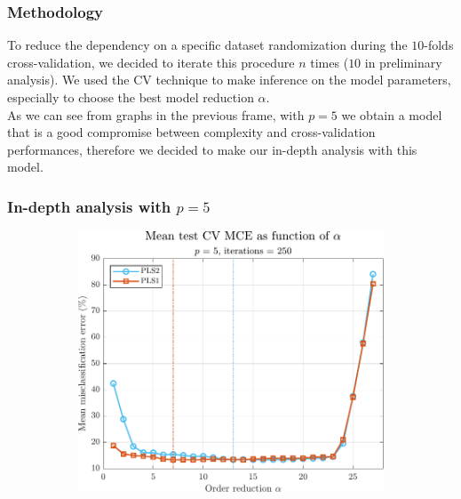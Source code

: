\begin{frame}
	\frametitle{Methodology}
	To reduce the dependency on a specific dataset randomization during the $10$-folds cross-validation, we decided to iterate this procedure $n$ times ($10$ in preliminary analysis). We used the CV technique to make inference on the model parameters, especially to choose the best model reduction $\alpha$.\\ As we can see from graphs in the previous frame, with $p = 5$ we obtain a model that is a good compromise between complexity and cross-validation performances, therefore we decided to make our in-depth analysis with this model.
\end{frame}

\begin{frame}
	\frametitle{In-depth analysis with $p = 5$}
	\begin{figure}
		\centering
		\begin{subfigure}[b]{0.49\textwidth}
			\includegraphics[width=\textwidth]{Images/trend_alpha_5.pdf}
		\end{subfigure}
		\hfill
		\begin{subfigure}[b]{0.49\textwidth}

\end{subfigure}
\end{figure}
\end{frame}
